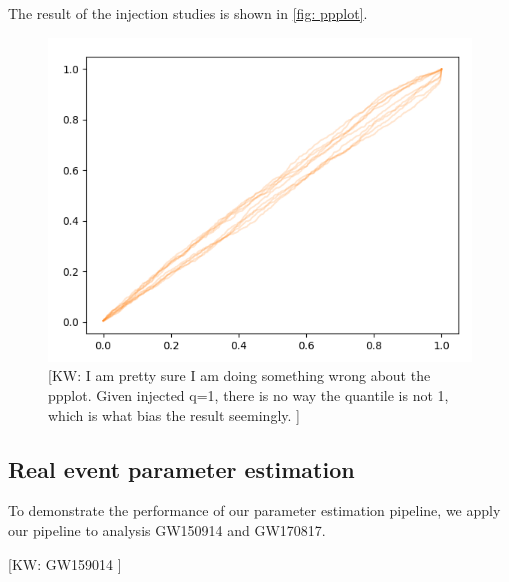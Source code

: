 \documentclass[twocolumn]{aastex631}
\newcommand{\kw}[1]{{\color{rb4}[KW: #1 ]}}
\begin{document}
The result of the injection studies is shown in \ref{fig: ppplot}.

\begin{figure}
    \includegraphics[width=0.99\linewidth]{static/ppplot.png}
    \caption{ \kw{I am pretty sure I am doing something wrong about the ppplot.
        Given injected q=1, there is no way the quantile is not 1, which is what
        bias the result seemingly.} }
    \label{fig:ppplot}
    \end{figure}

\subsection{Real event parameter estimation}

To demonstrate the performance of our parameter estimation pipeline, we apply
our pipeline to analysis GW150914 and GW170817. 

\kw{GW159014}
\end{document}
